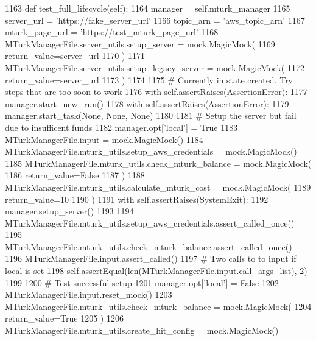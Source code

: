 \begin{DoxyCode}
1163     \textcolor{keyword}{def }test\_full\_lifecycle(self):
1164         manager = self.mturk\_manager
1165         server\_url = \textcolor{stringliteral}{'https://fake\_server\_url'}
1166         topic\_arn = \textcolor{stringliteral}{'aws\_topic\_arn'}
1167         mturk\_page\_url = \textcolor{stringliteral}{'https://test\_mturk\_page\_url'}
1168         MTurkManagerFile.server\_utils.setup\_server = mock.MagicMock(
1169             return\_value=server\_url
1170         )
1171         MTurkManagerFile.server\_utils.setup\_legacy\_server = mock.MagicMock(
1172             return\_value=server\_url
1173         )
1174 
1175         \textcolor{comment}{# Currently in state created. Try steps that are too soon to work}
1176         with self.assertRaises(AssertionError):
1177             manager.start\_new\_run()
1178         with self.assertRaises(AssertionError):
1179             manager.start\_task(\textcolor{keywordtype}{None}, \textcolor{keywordtype}{None}, \textcolor{keywordtype}{None})
1180 
1181         \textcolor{comment}{# Setup the server but fail due to insufficent funds}
1182         manager.opt[\textcolor{stringliteral}{'local'}] = \textcolor{keyword}{True}
1183         MTurkManagerFile.input = mock.MagicMock()
1184         MTurkManagerFile.mturk\_utils.setup\_aws\_credentials = mock.MagicMock()
1185         MTurkManagerFile.mturk\_utils.check\_mturk\_balance = mock.MagicMock(
1186             return\_value=\textcolor{keyword}{False}
1187         )
1188         MTurkManagerFile.mturk\_utils.calculate\_mturk\_cost = mock.MagicMock(
1189             return\_value=10
1190         )
1191         with self.assertRaises(SystemExit):
1192             manager.setup\_server()
1193 
1194         MTurkManagerFile.mturk\_utils.setup\_aws\_credentials.assert\_called\_once()
1195         MTurkManagerFile.mturk\_utils.check\_mturk\_balance.assert\_called\_once()
1196         MTurkManagerFile.input.assert\_called()
1197         \textcolor{comment}{# Two calls to to input if local is set}
1198         self.assertEqual(len(MTurkManagerFile.input.call\_args\_list), 2)
1199 
1200         \textcolor{comment}{# Test successful setup}
1201         manager.opt[\textcolor{stringliteral}{'local'}] = \textcolor{keyword}{False}
1202         MTurkManagerFile.input.reset\_mock()
1203         MTurkManagerFile.mturk\_utils.check\_mturk\_balance = mock.MagicMock(
1204             return\_value=\textcolor{keyword}{True}
1205         )
1206         MTurkManagerFile.mturk\_utils.create\_hit\_config = mock.MagicMock()

\end{DoxyCode}
